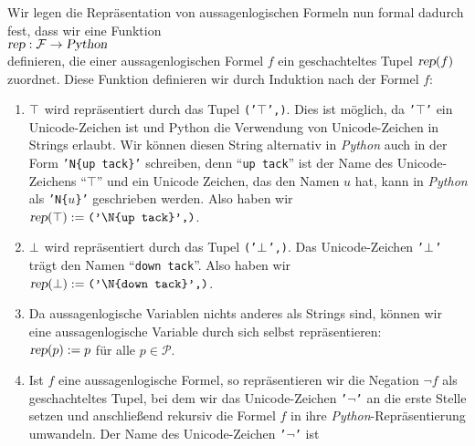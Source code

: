 Wir legen die Repräsentation von aussagenlogischen Formeln nun formal dadurch fest, dass wir eine Funktion
\\[0.2cm]
\hspace*{1.3cm}
$\textsl{rep}: \mathcal{F} \rightarrow \textsl{Python}$
\\[0.2cm]
definieren, die einer aussagenlogischen Formel $f$ ein geschachteltes Tupel 
$\textsl{rep}(f)$ zuordnet.  Diese Funktion definieren wir durch Induktion nach der Formel $f$:
\begin{enumerate}
\item $\top$ wird repräsentiert durch das Tupel \texttt{('$\top$',)}.
      Dies ist möglich, da \texttt{'$\top$'} ein Unicode-Zeichen ist und Python die Verwendung von
      Unicode-Zeichen in Strings erlaubt.  Wir können diesen String alternativ in \textsl{Python} 
      auch in der Form
      \texttt{'N\{up tack\}'} schreiben, denn ``\texttt{up tack}'' ist der Name des
      Unicode-Zeichens ``$\top$'' und ein Unicode Zeichen, das den Namen $u$ hat, kann in \textsl{Python}
      als \texttt{'N\{$u$\}'} geschrieben werden.  Also haben wir
      \\[0.2cm]
      \hspace*{1.3cm}
      $\textsl{rep}(\verum) := \texttt{('\symbol{92}N\{up tack\}',)}$.
\item $\bot$  wird repräsentiert durch das Tupel \texttt{('$\bot$',)}.
      Das Unicode-Zeichen \texttt{'$\bot$'} trägt den Namen \linebreak
      ``\texttt{down tack}''.
      Also haben wir
      \\[0.2cm]
      \hspace*{1.3cm}
      $\textsl{rep}(\falsum) := \texttt{('\symbol{92}N\{down tack\}',)}$.
\item Da aussagenlogische Variablen nichts anderes als Strings sind, können wir eine aussagen\-logische Variable
      durch sich selbst repräsentieren:
      \\[0.2cm]
      \hspace*{1.3cm}
      $\textsl{rep}(p) := p$ \quad für alle $p \in \mathcal{P}$.
\item Ist $f$ eine aussagenlogische Formel, so repräsentieren wir die Negation $\neg f$ als geschachteltes Tupel,
      bei dem wir das Unicode-Zeichen \texttt{'$\neg$'} an die erste Stelle setzen und anschließend
      rekursiv die Formel $f$ in ihre \textsl{Python}-Repräsentierung umwandeln.
      Der Name des Unicode-Zeichen \texttt{'$\neg$'} ist 

\end{enumerate}
